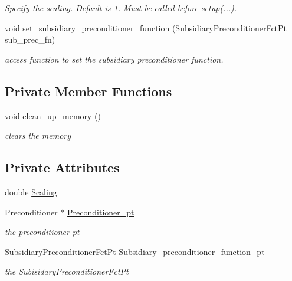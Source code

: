 \begin{DoxyCompactItemize}
\begin{DoxyCompactList}\small\item\em Specify the scaling. Default is 1. Must be called before setup(...). \end{DoxyCompactList}\item 
void \hyperlink{classoomph_1_1PseudoElasticPreconditionerSubsidiaryPreconditionerOld_a6fd50251d78370846929956b3eabf310}{set\+\_\+subsidiary\+\_\+preconditioner\+\_\+function} (\hyperlink{classoomph_1_1PseudoElasticPreconditionerSubsidiaryPreconditionerOld_a2ee5b7ddad26a4eb6662e2b701ab0a52}{Subsidiary\+Preconditioner\+Fct\+Pt} sub\+\_\+prec\+\_\+fn)
\begin{DoxyCompactList}\small\item\em access function to set the subsidiary preconditioner function. \end{DoxyCompactList}\end{DoxyCompactItemize}
\subsection*{Private Member Functions}
\begin{DoxyCompactItemize}
\item 
void \hyperlink{classoomph_1_1PseudoElasticPreconditionerSubsidiaryPreconditionerOld_a45086bd75b2d82f65deae8cac23c4c47}{clean\+\_\+up\+\_\+memory} ()
\begin{DoxyCompactList}\small\item\em clears the memory \end{DoxyCompactList}\end{DoxyCompactItemize}
\subsection*{Private Attributes}
\begin{DoxyCompactItemize}
\item 
double \hyperlink{classoomph_1_1PseudoElasticPreconditionerSubsidiaryPreconditionerOld_a9815c3c63cc82fcfb7bcd914459e5445}{Scaling}
\item 
Preconditioner $\ast$ \hyperlink{classoomph_1_1PseudoElasticPreconditionerSubsidiaryPreconditionerOld_a48413dd5490629563b76bb34b1e2e256}{Preconditioner\+\_\+pt}
\begin{DoxyCompactList}\small\item\em the preconditioner pt \end{DoxyCompactList}\item 
\hyperlink{classoomph_1_1PseudoElasticPreconditionerSubsidiaryPreconditionerOld_a2ee5b7ddad26a4eb6662e2b701ab0a52}{Subsidiary\+Preconditioner\+Fct\+Pt} \hyperlink{classoomph_1_1PseudoElasticPreconditionerSubsidiaryPreconditionerOld_a15876ef914c08070cc025f3b6696e4e1}{Subsidiary\+\_\+preconditioner\+\_\+function\+\_\+pt}
\begin{DoxyCompactList}\small\item\em the Subisidary\+Preconditioner\+Fct\+Pt \end{DoxyCompactList}\end{DoxyCompactItemize}


